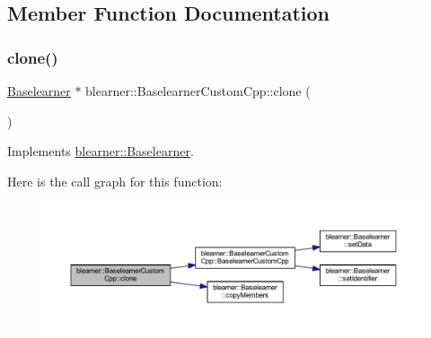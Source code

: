 \subsection{Member Function Documentation}
\mbox{\label{classblearner_1_1_baselearner_custom_cpp_a8478407ac4d8ed118fd1381f65df150a}} 
\subsubsection{\texorpdfstring{clone()}{clone()}}
{\footnotesize\ttfamily \mbox{\hyperlink{classblearner_1_1_baselearner}{Baselearner}} $\ast$ blearner\+::\+Baselearner\+Custom\+Cpp\+::clone (\begin{DoxyParamCaption}{ }\end{DoxyParamCaption})\hspace{0.3cm}{\ttfamily [virtual]}}



Implements \mbox{\hyperlink{classblearner_1_1_baselearner_a8e12c6739f085917a7d2da6570c51a21}{blearner\+::\+Baselearner}}.

Here is the call graph for this function\+:
\nopagebreak
\begin{figure}[H]
\begin{center}
\leavevmode
\includegraphics[width=350pt]{classblearner_1_1_baselearner_custom_cpp_a8478407ac4d8ed118fd1381f65df150a_cgraph}
\end{center}
\end{figure}
\mbox{\label{classblearner_1_1_baselearner_custom_cpp_ae130d3b469eff32c8e0be12d925cf88f}} 
